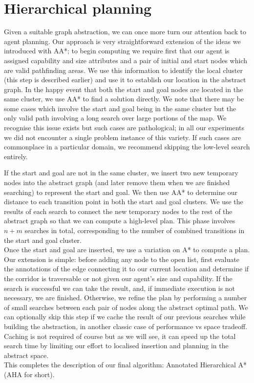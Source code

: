 \section{Hierarchical planning}
Given a suitable graph abstraction, we can once more turn our attention back to agent planning. Our approach is very straightforward extension of the ideas we introduced with AA*; to begin computing we require first that our agent is assigned capability and size attributes and a pair of initial and start nodes which are valid pathfinding areas. 
We use this information to identify the local cluster (this step is described earlier) and use it to establish our location in the abstract graph. In the happy event that both the start and goal nodes are located in the same cluster, we use AA* to find a solution directly. We note that there may be some cases which involve the start and goal being in the same cluster but the only valid path involving a long search over large portions of the map. We recognise this issue exists but such cases are pathological; in all our experiments we did not encounter a single problem instance of this variety. If such cases are commonplace in a particular domain, we recommend skipping the low-level search entirely. \\ \newline

If the start and goal are not in the same cluster, we insert two new temporary nodes into the abstract graph (and later remove them when we are finished searching) to represent the start and goal. We then use AA* to determine our distance to each transition point in both the start and goal clusters. We use the results of each search to connect the new temporary nodes to the rest of the abstract graph so that we can compute a high-level plan. This phase involves $n+m$ searches in total, corresponding to the number of combined transitions in the start and goal cluster.\\ \newline
Once the start and goal are inserted, we use a variation on A* to compute a plan. Our extension is simple: before adding any node to the open list, first evaluate the annotations of the edge connecting it to our current location and determine if the corridor is traversable or not given our agent's size and capability.
If the search is successful we can take the result, and, if immediate execution is not necessary, we are finished. Otherwise, we refine the plan by performing a number of small searches between each pair of nodes along the abstract optimal path. We can optionally skip this step if we cache the result of our previous searches while building the abstraction, in another classic case of performance vs space tradeoff. Caching is not required of course but as we will see, it can speed up the total search time by limiting our effort to localised insertion and planning in the abstract space. \\ \newline 
This completes the description of our final algorithm: Annotated Hierarchical A* (AHA for short).
